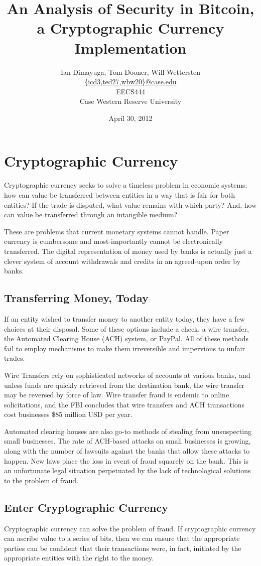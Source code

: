 \documentclass{report}
\title{An Analysis of Security in Bitcoin, a Cryptographic Currency
Implementation}
\author{Ian Dimayuga, Tom Dooner, Will Wettersten \\
\url{{icd3,ted27,wbw20}@case.edu} \\ EECS444
\\ Case Western Reserve University}
\date{April 30, 2012}
\begin{document}
\maketitle
\section*{Cryptographic Currency}
Cryptographic currency seeks to solve a timeless problem in economic systems:
how can value be transferred between entities in a way that is fair for both
entities? If the trade is disputed, what value remains with which party? And,
how can value be transferred through an intangible medium?

These are problems that current monetary systems cannot handle. Paper currency
is cumbersome and most-importantly cannot be electronically transferred. The
digital representation of money used by banks is actually just a clever system
of account withdrawals and credits in an agreed-upon order by banks.

\subsection*{Transferring Money, Today}
If an entity wished to transfer money to another entity today, they have a few
choices at their disposal. Some of these options include a check, a wire
transfer, the Automated Clearing House (ACH) system, or
PayPal\cite{wiki:wiretransfer}. All of these methods fail to employ mechanisms
to make them irreversible and impervious to unfair trades.

Wire Transfers rely on sophisticated networks of accounts at various banks, and
unless funds are quickly retrieved from the destination bank, the wire transfer
may be reversed by force of law. Wire transfer fraud is endemic to online
solicitations, and the FBI concludes that wire transfers and ACH transactions
cost businesses \$85 million USD per year\cite{wiretransferssuck}. 

Automated clearing houses are also go-to methods of stealing from unsuspecting
small businesses. The rate of ACH-based attacks on small businesses is growing,
along with the number of lawsuits against the banks that allow these attacks to
happen\cite{achsucks}. New laws place the loss in event of fraud squarely on the
bank. This is an unfortunate legal situation perpetuated by the lack of
technological solutions to the problem of fraud.

\subsection*{Enter Cryptographic Currency}
Cryptographic currency can solve the problem of fraud. If cryptographic currency
can ascribe value to a series of bits, then we can ensure that the appropriate
parties can be confident that their transactions were, in fact, initiated by the
appropriate entities with the right to the money.
\end{document}
